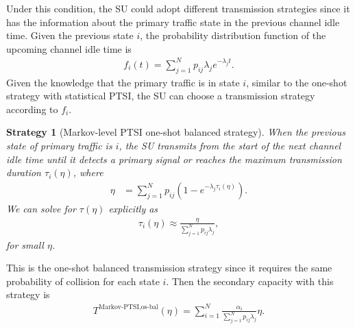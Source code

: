 \documentclass[10pt,final,journal,letterpaper]{IEEEtran}
\newtheorem{strategy}{Strategy}
\begin{document}
\par
Under this condition, the SU could adopt different transmission strategies since it has the information about the primary traffic state in the previous channel idle time. Given the previous state $i$, the probability distribution function of the upcoming channel idle time is
\begin{align}
    f_i(t)=\sum_{j=1}^{N}p_{ij}\lambda_je^{-\lambda_jt}.\nonumber
\end{align}
Given the knowledge that the primary traffic is in state $i$, similar to the one-shot strategy with statistical PTSI, the SU can choose a transmission strategy according to $f_i$.
\begin{strategy}[Markov-level PTSI one-shot balanced strategy]
When the previous state of primary traffic is $i$, the SU transmits from the start of the next channel idle time until it detects a primary signal or reaches the maximum transmission duration $\tau_i(\eta)$, where
\begin{align}
    \eta&=\sum_{j=1}^{N}p_{ij}(1-e^{-\lambda_j\tau_i(\eta)}).\nonumber
\end{align}
We can solve for $\tau(\eta)$ explicitly as
\begin{align}
    \tau_i(\eta)\approx\frac{\eta}{\sum_{j=1}^{N}p_{ij}\lambda_j},\nonumber
\end{align}
for small $\eta$.
\end{strategy}
This is the one-shot balanced transmission strategy since it requires the same probability of collision for each state $i$. Then the secondary capacity with this strategy is
\begin{align}\label{sec3eq9}
    T^{\text{Markov-PTSI,os-bal}}(\eta)=\sum_{i=1}^N\frac{\alpha_i}{\sum_{j=1}^{N}p_{ij}\lambda_j}\eta.
\end{align}
\end{document}
